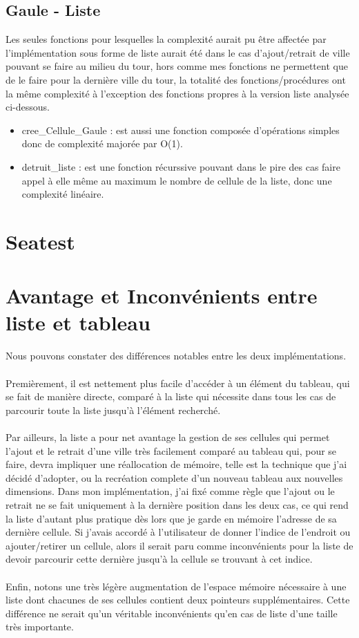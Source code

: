 \documentclass[a4paper, 11pt, oneside]{article}
\begin{document}
\subsection{\textbf{Gaule - Liste}}
Les seules fonctions pour lesquelles la complexité aurait pu être affectée par l'implémentation sous 
forme de liste aurait été dans le cas d'ajout/retrait de ville pouvant se faire au milieu du tour, 
hors comme mes fonctions ne permettent que de le faire pour la dernière ville du tour, la totalité 
des fonctions/procédures ont la même complexité à l'exception des fonctions propres à la version liste 
analysée ci-dessous.
\begin{itemize}
    \item cree\_Cellule\_Gaule : est aussi une fonction composée d'opérations simples donc de complexité 
    majorée par O(1).
    \item detruit\_liste : est une fonction récurssive pouvant dans le pire des cas faire appel à elle même 
    au maximum le nombre de cellule de la liste, donc une complexité linéaire.
\end{itemize}

\section{\textbf{Seatest}}

\section{\textbf{Avantage et Inconvénients entre liste et tableau}}
Nous pouvons constater des différences notables entre les deux implémentations.

\paragraph{} Premièrement, il est nettement plus facile d'accéder à un élément du tableau, qui se fait 
de manière directe, comparé à la liste qui nécessite dans tous les cas de parcourir toute la liste 
jusqu'à l'élément recherché.

\paragraph{} Par ailleurs, la liste a pour net avantage la gestion de ses cellules qui permet l'ajout et le retrait 
d'une ville très facilement comparé au tableau qui, pour se faire, devra impliquer une réallocation de mémoire, 
telle est la technique que j'ai décidé d'adopter, ou la recréation complete d'un nouveau tableau aux nouvelles dimensions. 
Dans mon implémentation, j'ai fixé comme règle que l'ajout ou le retrait ne se fait uniquement à la dernière position 
dans les deux cas, ce qui rend la liste d'autant plus pratique dès lors que je garde en mémoire l'adresse de sa 
dernière cellule. Si j'avais accordé à l'utilisateur de donner l'indice de l'endroit ou ajouter/retirer un cellule, 
alors il serait paru comme inconvénients pour la liste de devoir parcourir cette dernière jusqu'à la cellule se trouvant à cet indice.

\paragraph{} Enfin, notons une très légère augmentation de l'espace mémoire nécessaire à une liste dont chacunes 
de ses cellules contient deux pointeurs supplémentaires. Cette différence ne serait qu'un véritable inconvénients qu'en cas 
de liste d'une taille très importante.
\end{document}
